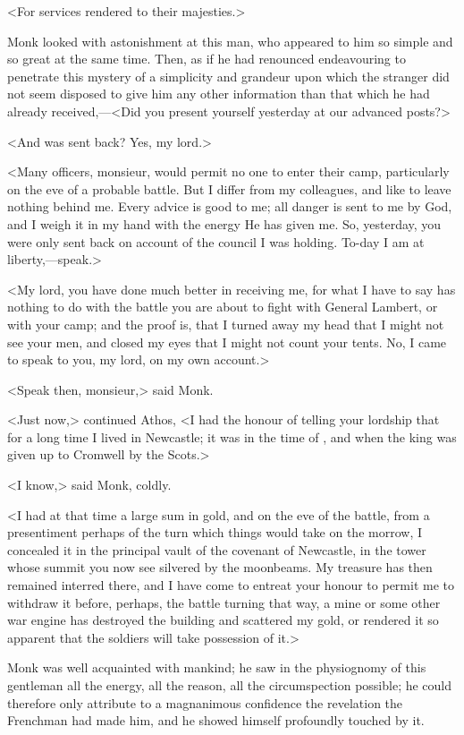 <For services rendered to their majesties.>

Monk looked with astonishment at this man, who appeared to him so simple and so great at the same time. Then, as if he had renounced endeavouring to penetrate this mystery of a simplicity and grandeur upon which the stranger did not seem disposed to give him any other information than that which he had already received,—<Did you present yourself yesterday at our advanced posts?>

<And was sent back? Yes, my lord.>

<Many officers, monsieur, would permit no one to enter their camp, particularly on the eve of a probable battle. But I differ from my colleagues, and like to leave nothing behind me. Every advice is good to me; all danger is sent to me by God, and I weigh it in my hand with the energy He has given me. So, yesterday, you were only sent back on account of the council I was holding. To-day I am at liberty,—speak.>

<My lord, you have done much better in receiving me, for what I have to say has nothing to do with the battle you are about to fight with General Lambert, or with your camp; and the proof is, that I turned away my head that I might not see your men, and closed my eyes that I might not count your tents. No, I came to speak to you, my lord, on my own account.>

<Speak then, monsieur,> said Monk.

<Just now,> continued Athos, <I had the honour of telling your lordship that for a long time I lived in Newcastle; it was in the time of , and when the king was given up to Cromwell by the Scots.>

<I know,> said Monk, coldly.

<I had at that time a large sum in gold, and on the eve of the battle, from a presentiment perhaps of the turn which things would take on the morrow, I concealed it in the principal vault of the covenant of Newcastle, in the tower whose summit you now see silvered by the moonbeams. My treasure has then remained interred there, and I have come to entreat your honour to permit me to withdraw it before, perhaps, the battle turning that way, a mine or some other war engine has destroyed the building and scattered my gold, or rendered it so apparent that the soldiers will take possession of it.>

Monk was well acquainted with mankind; he saw in the physiognomy of this gentleman all the energy, all the reason, all the circumspection possible; he could therefore only attribute to a magnanimous confidence the revelation the Frenchman had made him, and he showed himself profoundly touched by it.

